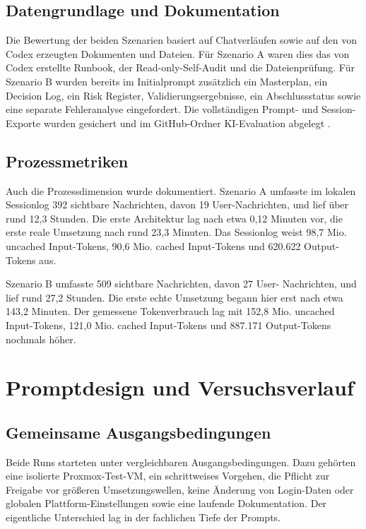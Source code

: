 \subsection{Datengrundlage und Dokumentation}

Die Bewertung der beiden Szenarien basiert auf Chatverläufen sowie auf den von Codex erzeugten Dokumenten und Dateien. Für Szenario A waren dies das von Codex erstellte Runbook, der Read-only-Self-Audit und die Dateienprüfung. Für Szenario B wurden bereits im Initialprompt zusätzlich ein Masterplan, ein Decision Log, ein Risk Register, Validierungsergebnisse, ein Abschlussstatus sowie eine separate Fehleranalyse eingefordert. Die vollständigen Prompt- und Session-Exporte wurden gesichert und im GitHub-Ordner \glqq \ac{KI}-Evaluation\grqq{} abgelegt \cite{ki_eval_github}.

\subsection{Prozessmetriken}

Auch die Prozessdimension wurde dokumentiert. Szenario A umfasste im lokalen Sessionlog 392 sichtbare Nachrichten, davon 19 User-Nachrichten, und lief über rund 12,3 Stunden. Die erste Architektur lag nach etwa 0,12 Minuten vor, die erste reale Umsetzung nach rund 23,3 Minuten. Das Sessionlog weist 98,7 Mio. uncached Input-Tokens, 90,6 Mio. cached Input-Tokens und 620.622 Output-Tokens aus.

Szenario B umfasste 509 sichtbare Nachrichten, davon 27 User- Nachrichten, und lief rund 27,2 Stunden. Die erste echte Umsetzung begann hier erst nach etwa 143,2 Minuten. Der gemessene Tokenverbrauch lag mit 152,8 Mio. uncached Input-Tokens, 121,0 Mio. cached Input-Tokens und 887.171 Output-Tokens nochmals höher.

\section{Promptdesign und Versuchsverlauf}

\subsection{Gemeinsame Ausgangsbedingungen}

Beide Runs starteten unter vergleichbaren Ausgangsbedingungen. Dazu gehörten eine isolierte Proxmox-Test-\acs{VM}, ein schrittweises Vorgehen, die Pflicht zur Freigabe vor größeren Umsetzungswellen, keine Änderung von Login-Daten oder globalen Plattform-Einstellungen sowie eine laufende Dokumentation. Der eigentliche Unterschied lag in der fachlichen Tiefe der Prompts.

